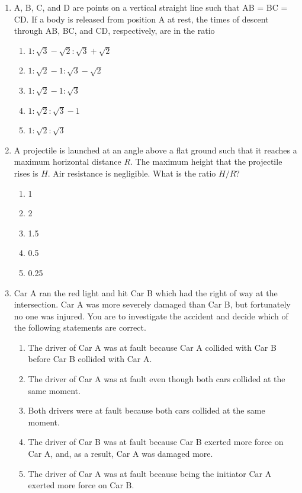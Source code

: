 \documentclass[12pt,letterpaper]{article}
\begin{document}
\begin{enumerate}
\item
A, B, C, and D are points on a vertical straight line such that AB = BC = CD. If a body is released from position A at rest, the times of descent through AB, BC, and CD, respectively, are in the ratio
\begin{enumerate}
\item $1:\sqrt{3}-\sqrt{2}:\sqrt{3}+\sqrt{2}$
\item $1:\sqrt{2}-1:\sqrt{3}-\sqrt{2}$
\item $1:\sqrt{2}-1:\sqrt{3}$
\item $1:\sqrt{2}:\sqrt{3}-1$
\item $1:\sqrt{2}:\sqrt{3}$
\end{enumerate}

\item
A projectile is launched at an angle above a flat ground such that it reaches a maximum horizontal distance $R$. The maximum height that the projectile rises is $H$. Air resistance is negligible. What is the ratio $H/R$?
\begin{enumerate}
\item 1
\item 2
\item 1.5
\item 0.5
\item 0.25
\end{enumerate}

\item
Car A ran the red light and hit Car B which had the right of way at the intersection. Car A was more severely damaged than Car B, but fortunately no one was injured. You are to investigate the accident and decide which of the following statements are correct.
\begin{enumerate}
\item The driver of Car A was at fault because Car A collided with Car B before Car B collided with Car A.
\item The driver of Car A was at fault even though both cars collided at the same moment.
\item Both drivers were at fault because both cars collided at the same moment.
\item The driver of Car B was at fault because Car B exerted more force on Car A, and, as a result, Car A was damaged more.
\item The driver of Car A was at fault because being the initiator Car A exerted more force on Car B.
\end{enumerate}


\end{enumerate}
\end{document}
